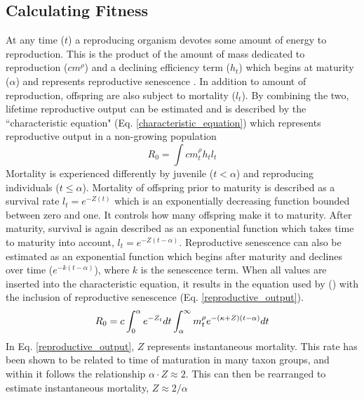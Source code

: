 \documentclass[a4paper, 11pt, hidelinks]{article} %
\begin{document}
	
	
	\subsection{Calculating Fitness}
	At any time ($ t $) a reproducing organism devotes some amount of energy to reproduction.  This is the product of the amount of mass dedicated to reproduction ($ cm^\rho $) and a declining efficiency term ($ h_t $) which begins at maturity ($ \alpha $) and represents reproductive senescence \parencite{Benoit2018, Vrtilek2018, Stearns2000}.  In addition to amount of reproduction, offspring are also subject to mortality ($ l_t $).  By combining the two, lifetime reproductive output can be estimated and is described by the ``characteristic equation" (Eq. \ref{characteristic_equation}) which represents reproductive output in a non-growing population \parencite{Tsoukali2016, roff1993, Roff2001, stearns1992evolution, Arendt2011, Roff1986, Roff1984}
	\begin{equation}
		\label{characteristic_equation}
		R_0 = \int c m_t^\rho h_t l_t 
	\end{equation}
	Mortality is experienced differently by juvenile ($ t < \alpha $) and reproducing individuals ($ t \leq \alpha $). %
	Mortality of offspring prior to maturity is described as a survival rate $ l_t = e^{-Z(t)} $ which is an exponentially decreasing function bounded between zero and one.  It controls how many offspring make it to maturity.  After maturity, survival is again described as an exponential function which takes time to maturity into account, $ l_t = e^{-Z(t-\alpha)} $.  
	Reproductive senescence can also be estimated as an exponential function which begins after maturity and declines over time  ($ e^{-k(t-\alpha)} $), where $ k $ is the senescence term.  When all values are inserted into the characteristic equation, it results in the equation used by \citeauthor{Charnov2001} (\citeyear{Charnov2001}) with the inclusion of reproductive senescence (Eq. \ref{reproductive_output}).
	\begin{equation}
		\label{reproductive_output}
		R_0 = c\int_0^\alpha e^{-Z_t} dt  \int_\alpha^\infty m_t^\rho e^{-(\kappa + Z)(t - \alpha)}dt\\
	\end{equation} 
	In Eq. \ref{reproductive_output}, $ Z $ represents instantaneous mortality.  This rate has been shown to be related to time of maturation in many taxon groups, and within it follows the relationship $ \alpha \cdot Z \approx  2$.  This can then be rearranged to estimate instantaneous mortality, $ Z \approx 2/\alpha  $
	
\end{document}
